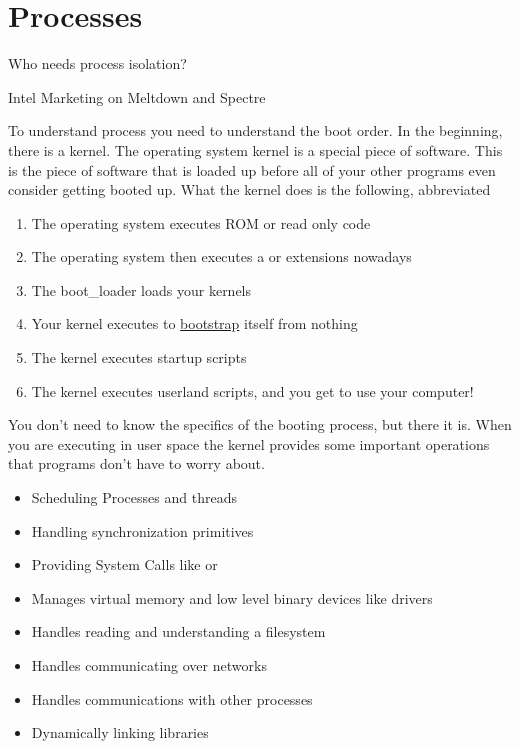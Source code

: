\chapter{Processes}

\epigraph{Who needs process isolation?}{Intel Marketing on Meltdown and Spectre}

To understand process you need to understand the boot order.
In the beginning, there is a kernel.
The operating system kernel is a special piece of software.
This is the piece of software that is loaded up before all of your other programs even consider getting booted up.
What the kernel does is the following, abbreviated

\begin{enumerate}
\item
  The operating system executes ROM or read only code
\item
  The operating system then executes a  or  extensions nowadays
\item
  The boot\_loader loads your kernels
\item
  Your kernel executes  to \href{https://en.wikipedia.org/wiki/Bootstrapping}{bootstrap} itself from nothing
\item
  The kernel executes startup scripts
\item
  The kernel executes userland scripts, and you get to use your computer!
\end{enumerate}

You don't need to know the specifics of the booting process, but there it is.
When you are executing in user space the kernel provides some important operations that programs don't have to worry about.

\begin{itemize}
\item Scheduling Processes and threads
\item Handling synchronization primitives
\item Providing System Calls like  or 
\item Manages virtual memory and low level binary devices like  drivers
\item Handles reading and understanding a filesystem
\item Handles communicating over networks
\item Handles communications with other processes
\item Dynamically linking libraries
\end{itemize}

